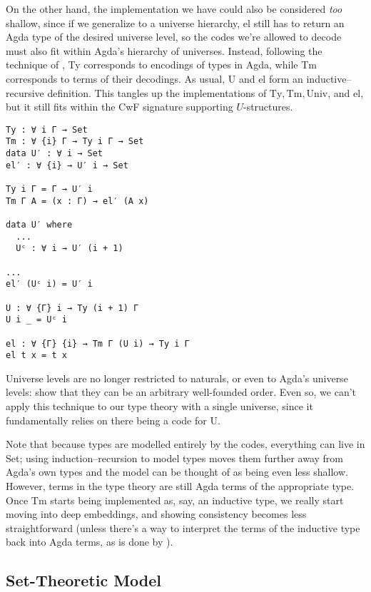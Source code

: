 \documentclass{article}
\renewcommand{\_}{\textrm{\textscale{.5}{\textunderscore}}}
\newcommand{\Tm}{\mathrm{Tm}}
\newcommand{\Ty}{\mathrm{Ty}}
\newcommand{\univ}{\mathrm{Univ}}
\newcommand{\El}{\mathrm{el}}
\theoremstyle{definition}
\theoremstyle{plain}
\begin{document}
On the other hand, the implementation we have could also be considered \emph{too} shallow,
since if we generalize to a universe hierarchy,
{\codefont el} still has to return an Agda type of the desired universe level,
so the codes we're allowed to decode must also fit within Agda's hierarchy of universes.
Instead, following the technique of \citet{hierarchy},
{\codefont Ty} corresponds to encodings of types in Agda,
while {\codefont Tm} corresponds to terms of their decodings.
As usual, {\codefont U} and {\codefont el} form an inductive--recursive definition.
This tangles up the implementations of $\Ty, \Tm, \univ$, and $\El$,
but it still fits within the CwF signature supporting $U$-structures.

\begin{verbatim}
Ty : ∀ i Γ → Set
Tm : ∀ {i} Γ → Ty i Γ → Set
data U′ : ∀ i → Set
el′ : ∀ {i} → U′ i → Set

Ty i Γ = Γ → U′ i
Tm Γ A = (x : Γ) → el′ (A x)

data U′ where
  ...
  Uᶜ : ∀ i → U′ (i + 1)

...
el′ (Uᶜ i) = U′ i

U : ∀ {Γ} i → Ty (i + 1) Γ
U i _ = Uᶜ i

el : ∀ {Γ} {i} → Tm Γ (U i) → Ty i Γ
el t x = t x
\end{verbatim}

Universe levels are no longer restricted to naturals,
or even to Agda's universe levels:
\citet{hierarchy} show that they can be an arbitrary well-founded order.
Even so, we can't apply this technique to our type theory with a single universe,
since it fundamentally relies on there being a code for {\codefont U}.

Note that because types are modelled entirely by the codes,
everything can live in {\codefont Set};
using induction--recursion to model types moves them further away from Agda's own types
and the model can be thought of as being even less shallow.
However, terms in the type theory are still Agda terms of the appropriate type.
Once $\Tm$ starts being implemented as, say, an inductive type,
we really start moving into deep embeddings,
and showing consistency becomes less straightforward
(unless there's a way to interpret the terms of the inductive type back into Agda terms,
as is done by \citet{kipling}).

\subsection{Set-Theoretic Model}
\end{document}
